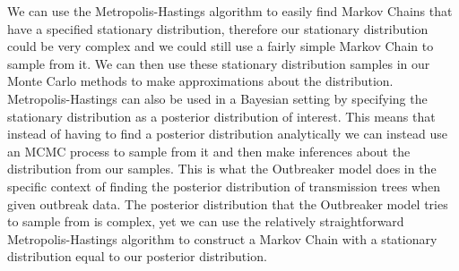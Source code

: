 \documentclass[11pt,a4paper]{report}
\begin{document}
We can use the Metropolis-Hastings algorithm to easily find Markov Chains that have a specified stationary distribution, therefore our stationary distribution could be very complex and we could still use a fairly simple Markov Chain to sample from it. We can then use these stationary distribution samples in our Monte Carlo methods to make approximations about the distribution. Metropolis-Hastings can also be used in a Bayesian setting by specifying the stationary distribution as a posterior distribution of interest. This means that instead of having to find a posterior distribution analytically we can instead use an MCMC process to sample from it and then make inferences about the distribution from our samples. This is what the Outbreaker model does in the specific context of finding the posterior distribution of transmission trees when given outbreak data. The posterior distribution that the Outbreaker model tries to sample from is complex, yet we can use the relatively straightforward Metropolis-Hastings algorithm  to construct a Markov Chain with a stationary distribution equal to our posterior distribution.
\end{document}
